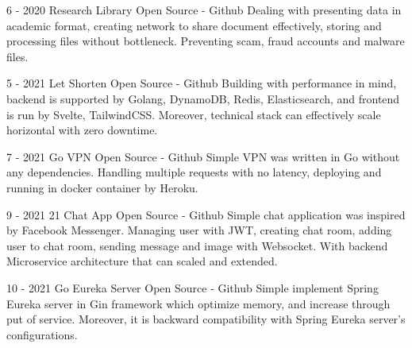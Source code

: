 \documentclass[10pt,A4]{article}
\begin{document}
\begin{paracol}{2}
\begin{rightcolumn}
{}
	
\cvevent
	{6 - 2020}
	{Research Library}
	{Open Source - Github}
	{Dealing with presenting data in academic format, creating network to share document effectively, storing and processing files without bottleneck. Preventing scam, fraud accounts and malware files.}
	
\cvevent
	{5 - 2021}
	{Let Shorten}
	{Open Source - Github}
	{Building with performance in mind, backend is supported by Golang, DynamoDB, Redis, Elasticsearch, and frontend is run by Svelte, TailwindCSS. Moreover, technical stack can effectively scale horizontal with zero downtime.}
	
\cvevent
	{7 - 2021}
	{Go VPN}
	{Open Source - Github}
	{Simple VPN was written in Go without any dependencies. Handling multiple requests with no latency, deploying and running in docker container by Heroku.}
	
\cvevent
	{9 - 2021}
	{21 Chat App}
	{Open Source - Github}
	{Simple chat application was inspired by Facebook Messenger. Managing user with JWT, creating chat room, adding user to chat room, sending message and image with Websocket. With backend Microservice architecture that can scaled and extended.}

\cvevent
	{10 - 2021}
	{Go Eureka Server}
	{Open Source - Github}
	{Simple implement Spring Eureka server in Gin framework which optimize memory, and increase through put of service. Moreover, it is backward compatibility with Spring Eureka server's configurations.}

\end{rightcolumn}
\end{paracol}
\end{document}
